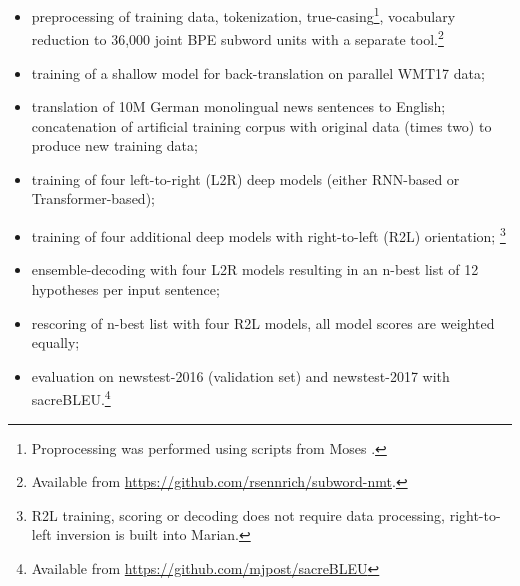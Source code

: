 \documentclass[11pt,a4paper]{article}
\begin{document}
\begin{itemize}
\item preprocessing of training data, tokenization, true-casing\footnote{Proprocessing was performed using scripts from Moses \cite{conf/acl/KoehnHBCFBCSMZDBCH07}.}, vocabulary reduction to 36,000 joint BPE subword units \cite{sennrich2016bpe} with a separate tool.\footnote{Available from \url{https://github.com/rsennrich/subword-nmt}.}
\item training of a shallow model for back-translation on parallel WMT17 data;
\item translation of 10M German monolingual news sentences to English; concatenation of artificial training corpus with original data (times two) to produce new training data;
\item training of four left-to-right (L2R) deep models (either RNN-based or Transformer-based);
\item training of four additional deep models with right-to-left (R2L) orientation; \footnote{R2L training, scoring or decoding does not require data processing, right-to-left inversion is built into Marian.}
\item ensemble-decoding with four L2R models resulting in an n-best list of 12 hypotheses per input sentence;
\item rescoring of n-best list with four R2L models, all model scores are weighted equally; 
\item evaluation on newstest-2016 (validation set) and newstest-2017 with sacreBLEU.\footnote{Available from \url{https://github.com/mjpost/sacreBLEU}}
\end{itemize}
\end{document}
